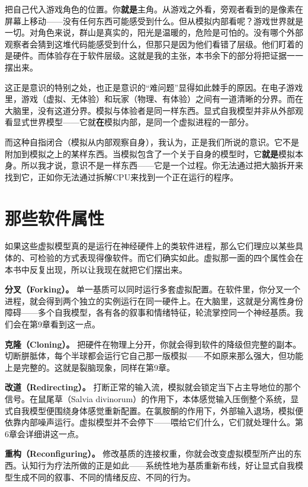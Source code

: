 \documentclass[11pt, twoside, openright]{book}
\begin{document}
把自己代入游戏角色的位置。你\textbf{就是}主角。从游戏之外看，旁观者看到的是像素在屏幕上移动------没有任何东西可能感受到什么。但从模拟内部看呢？游戏世界就是一切。对角色来说，群山是真实的，阳光是温暖的，危险是可怕的。没有哪个外部观察者会猜到这堆代码能感受到什么，但那只是因为他们看错了层级。他们盯着的是硬件。而体验存在于软件层级。这就是我的主张，本书余下的部分将把证据一一摆出来。

这正是意识的特别之处，也正是意识的“难问题”显得如此棘手的原因。在电子游戏里，游戏（虚拟、无体验）和玩家（物理、有体验）之间有一道清晰的分界。而在大脑里，没有这道分界。模拟与体验者是同一样东西。显式自我模型并非从外部观看显式世界模型------它就\textbf{在}模拟内部，是同一个虚拟进程的一部分。

而这种自指闭合（模拟从内部观察自身），我认为，正是我们所说的意识。它不是附加到模拟之上的某样东西。当模拟包含了一个关于自身的模型时，它\textbf{就是}模拟本身。所以我才说，意识不是一样东西------它是一个过程。你无法通过把大脑拆开来找到它，正如你无法通过拆解CPU来找到一个正在运行的程序。

\section*{那些软件属性}

如果这些虚拟模型真的是运行在神经硬件上的类软件进程，那么它们理应以某些具体的、可检验的方式表现得像软件。而它们确实如此。虚拟那一面的四个属性会在本书中反复出现，所以让我现在就把它们摆出来。

\textbf{分叉（Forking）。} 单一基质可以同时运行多套虚拟配置。在软件里，你分叉一个进程，就会得到两个独立的实例运行在同一硬件上。在大脑里，这就是分离性身份障碍------多个自我模型，各有各的叙事和情绪特征，轮流掌控同一个神经基质。我们会在第9章看到这一点。

\textbf{克隆（Cloning）。} 把硬件在物理上分开，你就会得到软件的降级但完整的副本。切断胼胝体，每个半球都会运行它自己那一版模拟------不如原来那么强大，但功能上是完整的。这就是裂脑现象，同样在第9章。

\textbf{改道（Redirecting）。} 打断正常的输入流，模拟就会锁定当下占主导地位的那个信号。在鼠尾草（Salvia divinorum）的作用下，本体感觉输入压倒整个系统，显式自我模型便围绕身体感觉重新配置。在氯胺酮的作用下，外部输入退场，模拟便依靠内部噪声运行。虚拟模型并不会停下------喂给它们什么，它们就处理什么。第6章会详细讲这一点。

\textbf{重构（Reconfiguring）。} 修改基质的连接权重，你就会改变虚拟模型所产出的东西。认知行为疗法所做的正是如此------系统性地为基质重新布线，好让显式自我模型生成不同的叙事、不同的情绪反应、不同的行为。
\end{document}
